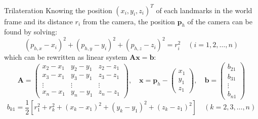 \documentclass[10pt]{beamer}
\begin{document}
    \begin{frame}[fragile]{Trilateration}
        \justifying
        Knowing the position $(x_{i}, y_{i}, z_{i})^{T}$ of each landmarks in the
        world frame and its distance $r_{i}$ from the camera, the position
        $\bm{p}_h$ of the camera can be found by solving:
        \begin{equation*}
            (p_{h,x} - x_i)^2 + (p_{h,y} - y_i)^2 + (p_{h,z} - z_i)^2 = r_i^2 \quad (i = 1, 2, \dots, n)
        \end{equation*}
        which can be rewritten as linear system $\bm{Ax}=\bm{b}$:
        \begin{equation*}
        \bm{A} = \begin{pmatrix}
                x_2 - x_1 & y_2 - y_1 & z_2 - z_1 \\
                x_3 - x_1 & y_3 - y_1 & z_3 - z_1 \\
                \vdots & \vdots & \vdots \\
                x_n - x_1 & y_n - y_1 & z_n - z_1
            \end{pmatrix}, \quad
        \bm{x} =
            \bm{p}_h -
            \begin{pmatrix}
                x_1 \\
                y_1 \\
                z_1
            \end{pmatrix}, \quad
        \bm{b} = \begin{pmatrix}
                b_{21} \\
                b_{31} \\
                \vdots \\
                b_{n1}
            \end{pmatrix}
    \end{equation*}
    \begin{equation*}
        b_{k1} = \frac{1}{2}\left[ r_1^2 + r_k^2 + (x_k - x_1)^2 + (y_k - y_1)^2 + (z_k - z_1)^2 \right] \quad (k = 2, 3, \dots, n)
    \end{equation*}

    \end{frame}
\end{document}
